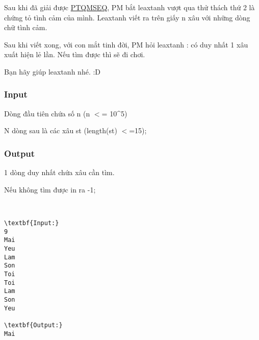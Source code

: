 

Sau khi đã giải được \href{http://vnoi.info/problems/show/PTQMSEQ/}{PTQMSEQ}, PM bắt leaxtanh vượt qua thử thách thứ 2 là chứng tỏ tình cảm của mình. Leaxtanh viết ra trên giấy n xâu với những dòng chữ tình cảm.

Sau khi viết xong, với con mắt tinh đời, PM hỏi leaxtanh : có duy nhất 1 xâu xuất hiện lẻ lần. Nếu tìm được thì sẽ đi chơi.

Bạn hãy giúp leaxtanh nhé. :D

\subsubsection{Input}

Dòng đầu tiên chứa số n (n $<$= 10\textasciicircum5)

N dòng sau là các xâu st (length(st) $<$=15);

\subsubsection{Output}

1 dòng duy nhất chứa xâu cần tìm.

Nếu không tìm được in ra -1;

 
\begin{verbatim}
\textbf{Input:}
9
Mai
Yeu
Lam
Son
Toi
Toi 
Lam
Son
Yeu

\textbf{Output:}
Mai\end{verbatim}